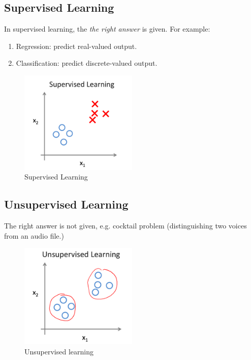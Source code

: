     
    \subsection{Supervised Learning}

        In supervised learning, the \emph{the right answer} is given. For example:
        \begin{enumerate}
            \item Regression: predict real-valued output.
            \item Classification: predict discrete-valued output.
        \end{enumerate}

    \begin{figure}[h]
        \centering
        \includegraphics[width=0.5\textwidth]{image/supervised-learning.png}
        \caption{Supervised Learning}
        \label{fig:supervised-learning}
    \end{figure}

    \subsection{Unsupervised Learning}
    The right answer is not given, e.g. cocktail problem (distinguishing two voices from an audio file.)

    \begin{figure}[h]
        \centering
        \includegraphics[width=0.5\textwidth]{image/unsupervised-learning.png}
        \caption{Unsupervised learning}
        \label{fig:unsupervised-learning}
    \end{figure}

